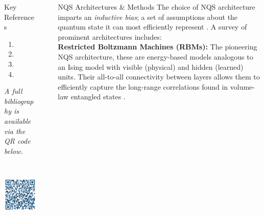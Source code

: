 \documentclass[final]{beamer}
\newlength{\sepwidth}
\newlength{\colwidth}
\newcommand{\separatorcolumn}{\begin{column}{\sepwidth}\end{column}}
\begin{document}
\begin{frame}[t]
\begin{columns}[t]
\begin{column}{\colwidth}
  \begin{block}{Key References}
    \vspace{-52px}
    \small
    
    \begin{enumerate}
        \item {}
        \item {}
        \item {}
        \item {}
    \end{enumerate}    
    \centering
    \vspace{6px}
    \textit{A full bibliography is available via the QR code below.}\\[0.8cm]
    \centering
    \includegraphics[height=4cm]{img/refs.png}
    
\end{block}
  
\end{column}

\separatorcolumn

\begin{column}{\colwidth}

  \begin{block}{NQS Architectures \& Methods}
    The choice of NQS architecture imparts an \textit{inductive bias}; a set of assumptions about the quantum state it can most efficiently represent \cite{Lange2024Review}. A survey of prominent architectures includes:\\[12px]
    
    \textbf{Restricted Boltzmann Machines (RBMs):} The pioneering NQS architecture, these are energy-based models analogous to an Ising model with visible (physical) and hidden (learned) units. Their all-to-all connectivity between layers allows them to efficiently capture the long-range correlations found in volume-law entangled states \cite{Carleo2017Science, Lange2024Review}.\\[12px]
        

\end{block}
\end{column}
\end{columns}
\end{frame}
\end{document}
